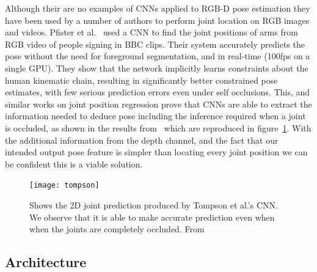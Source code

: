 \documentclass[11pt]{article} %
\begin{document}
Although their are no examples of CNNs applied to RGB-D pose estimation they have been used by a number of authors to perform joint location on RGB images and videos.
Pfister et al.~\cite{Pfister} used a CNN to find the joint positions of arms from RGB video of people signing in BBC clips. Their system accurately predicts the pose without the need for foreground segmentation, and in real-time (100fps on a single GPU). They show that the network implicitly learns constraints about the human kinematic chain, resulting in significantly better constrained pose estimates, with few serious prediction errors even under self occlusions. This, and similar works \cite{Toshev,Jain2013a,Accv2014,Li2014,Tompson,Tompson2014} on joint position regression prove that CNNs are able to extract the information needed to deduce pose including the inference required when a joint is occluded, as shown in the results from~\cite{Tompson} which are reproduced in figure~\ref{fig:Tompson}. With the additional information from the depth channel, and the fact that our intended output pose feature is simpler than locating every joint position we can be confident this is a viable solution. %
\begin{figure}
\texttt{[image: tompson]}
\centering
\caption{ Shows the 2D joint prediction produced by Tompson et al.'s CNN. We observe that it is able to make accurate prediction even when when the joints are completely occluded. From~\cite{Tompson}		\label{fig:Tompson}  } 
\end{figure}


\subsection{Architecture}
\end{document}
